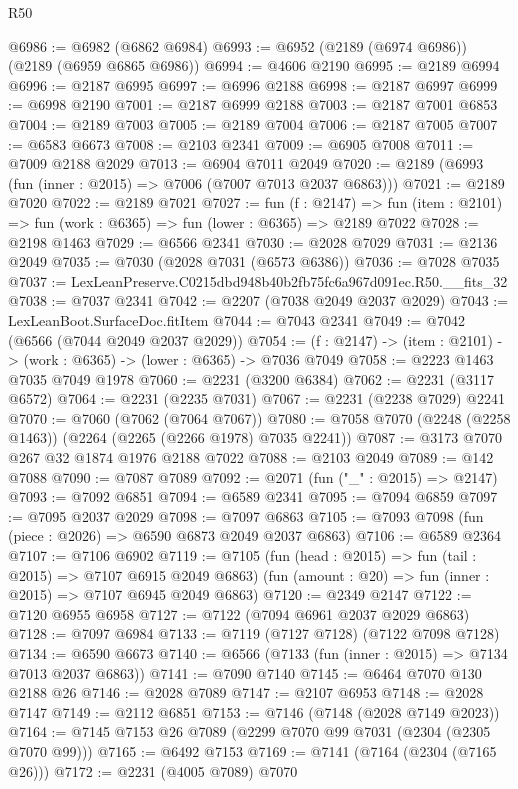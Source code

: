 \begin{lexlean}{R50}
\begin{coremodule}
@6986 := @6982 (@6862 @6984)
@6993 := @6952 (@2189 (@6974 @6986)) (@2189 (@6959 @6865 @6986))
@6994 := @4606 @2190
@6995 := @2189 @6994
@6996 := @2187 @6995
@6997 := @6996 @2188
@6998 := @2187 @6997
@6999 := @6998 @2190
@7001 := @2187 @6999 @2188
@7003 := @2187 @7001 @6853
@7004 := @2189 @7003
@7005 := @2189 @7004
@7006 := @2187 @7005
@7007 := @6583 @6673
@7008 := @2103 @2341
@7009 := @6905 @7008
@7011 := @7009 @2188 @2029
@7013 := @6904 @7011 @2049
@7020 := @2189 (@6993 (fun (inner : @2015) => @7006 (@7007 @7013 @2037 @6863)))
@7021 := @2189 @7020
@7022 := @2189 @7021
@7027 := fun (f : @2147) =>
  fun (item : @2101) => fun (work : @6365) => fun (lower : @6365) => @2189 @7022
@7028 := @2198 @1463
@7029 := @6566 @2341
@7030 := @2028 @7029
@7031 := @2136 @2049
@7035 := @7030 (@2028 @7031 (@6573 @6386))
@7036 := @7028 @7035
@7037 := LexLeanPreserve.C0215dbd948b40b2fb75fc6a967d091ec.R50.__fits_32
@7038 := @7037 @2341
@7042 := @2207 (@7038 @2049 @2037 @2029)
@7043 := LexLeanBoot.SurfaceDoc.fitItem
@7044 := @7043 @2341
@7049 := @7042 (@6566 (@7044 @2049 @2037 @2029))
@7054 := (f : @2147) -> (item : @2101) -> (work : @6365) -> (lower : @6365) -> @7036 @7049
@7058 := @2223 @1463 @7035 @7049 @1978
@7060 := @2231 (@3200 @6384)
@7062 := @2231 (@3117 @6572)
@7064 := @2231 (@2235 @7031)
@7067 := @2231 (@2238 @7029) @2241
@7070 := @7060 (@7062 (@7064 @7067))
@7080 := @7058 @7070 (@2248 (@2258 @1463)) (@2264 (@2265 (@2266 @1978) @7035 @2241))
@7087 := @3173 @7070 @267 @32 @1874 @1976 @2188 @7022
@7088 := @2103 @2049
@7089 := @142 @7088
@7090 := @7087 @7089
@7092 := @2071 (fun ("_" : @2015) => @2147)
@7093 := @7092 @6851
@7094 := @6589 @2341
@7095 := @7094 @6859
@7097 := @7095 @2037 @2029
@7098 := @7097 @6863
@7105 := @7093 @7098 (fun (piece : @2026) => @6590 @6873 @2049 @2037 @6863)
@7106 := @6589 @2364
@7107 := @7106 @6902
@7119 := @7105
    (fun (head : @2015) => fun (tail : @2015) => @7107 @6915 @2049 @6863)
    (fun (amount : @20) => fun (inner : @2015) => @7107 @6945 @2049 @6863)
@7120 := @2349 @2147
@7122 := @7120 @6955 @6958
@7127 := @7122 (@7094 @6961 @2037 @2029 @6863)
@7128 := @7097 @6984
@7133 := @7119 (@7127 @7128) (@7122 @7098 @7128)
@7134 := @6590 @6673
@7140 := @6566 (@7133 (fun (inner : @2015) => @7134 @7013 @2037 @6863))
@7141 := @7090 @7140
@7145 := @6464 @7070 @130 @2188 @26
@7146 := @2028 @7089
@7147 := @2107 @6953
@7148 := @2028 @7147
@7149 := @2112 @6851
@7153 := @7146 (@7148 (@2028 @7149 @2023))
@7164 := @7145 @7153 @26 @7089 (@2299 @7070 @99 @7031 (@2304 (@2305 @7070 @99)))
@7165 := @6492 @7153
@7169 := @7141 (@7164 (@2304 (@7165 @26)))
@7172 := @2231 (@4005 @7089) @7070

\end{coremodule}
\end{lexlean}

